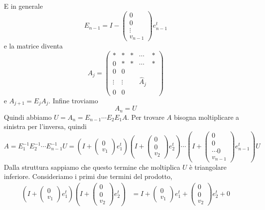 \documentclass[a4paper]{article}
\begin{document}
E in generale
\[
    E_{n-1} = I -
    \begin{pmatrix}
        0 \\ 0 \\ \vdots \\ v_{n-1}
    \end{pmatrix}e_{n-1}^t
\]
e la matrice diventa
\[
    A_j = \left(
        \begin{array}{cc|ccc}
            \ast & \ast & \ast & \cdots & \ast \\
            0 & \ast & \ast & \cdots & \ast \\
            \hline
            0 & 0 & & & \\
            \vdots & \vdots & & \hat{A}_j & \\
            0 & 0 & & &
        \end{array}
    \right)
\]
e \(A_{j+1} = E_jA_j\).
Infine troviamo
\[
    A_n = U
\]
Quindi abbiamo \(U=A_n = E_{n-1}\cdots E_2E_1 A\).
Per trovare \(A\) bisogna moltiplicare a sinistra per l'inversa, quindi
\[
    A = E_1^{-1}E_2^{-1}\cdots E_{n-1}^{-1} U
    = \left(
        I +
        \begin{pmatrix}0 \\ v_1
        \end{pmatrix}e_1^t
    \right)
    \left(
        I +
        \begin{pmatrix}0 \\ 0 \\ v_2
        \end{pmatrix}e_2^t
    \right)
    \cdots
    \left(
        I +
        \begin{pmatrix}0 \\ 0 \\ \cdots 0 \\ v_{n-1}
        \end{pmatrix}e_{n-1}^t
    \right)U
\]
Dalla struttura sappiamo che questo termine che moltiplica \(U\)
è triangolare inferiore.
Consideriamo i primi due termini del prodotto,
\begin{align*}
    \left(
        I +
        \begin{pmatrix}0 \\ v_1
        \end{pmatrix}e_1^t
    \right)
    \left(
        I +
        \begin{pmatrix}0 \\ 0 \\ v_2
        \end{pmatrix}e_2^t
    \right)
    &= I +
    \begin{pmatrix}0 \\ v_1
    \end{pmatrix}e_1^t
    +
    \begin{pmatrix}0 \\ 0 \\ v_2
    \end{pmatrix}e_2^t + 0
\end{align*}
\end{document}
